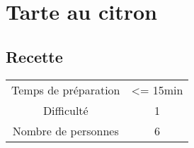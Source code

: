 \newpage
\section{Tarte au citron}
    \label{sec:Tarte au citron}
    \subsection{Recette}
    \vspace{1cm}


    \begin{center}
        \begin{tabular}{c|c}
            Temps de préparation & <= 15min \\
            Difficulté & 1 \\
            Nombre de personnes & 6 
        \end{tabular}
    \end{center}{}

    \vspace{1cm}
    \hline
    \vspace{1cm}

